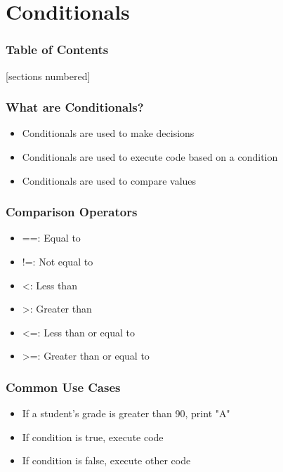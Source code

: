 \documentclass[serif, 9pt, aspectratio=32]{beamer}
\begin{document}
\section{Conditionals}

\begin{frame}
    \frametitle{Table of Contents}
    [sections numbered]
    \tableofcontents[currentsection]
\end{frame}

\begin{frame}
    \centering
    \frametitle{What are Conditionals?}
    \begin{itemize}
        \setlength{\itemsep}{3em}
        \item Conditionals are used to make decisions
        \item Conditionals are used to execute code based on a condition
        \item Conditionals are used to compare values
    \end{itemize}
\end{frame}

\begin{frame}
    \centering
    \frametitle{Comparison Operators}
    \begin{itemize}
        \setlength{\itemsep}{3em}
        \item ==: Equal to
        \item !=: Not equal to
        \item \textless: Less than
        \item \textgreater: Greater than
        \item \textless=: Less than or equal to
        \item \textgreater=: Greater than or equal to
    \end{itemize}
\end{frame}

\begin{frame}
    \centering
    \frametitle{Common Use Cases}
    \begin{itemize}
        \setlength{\itemsep}{3em}
        \item If a student's grade is greater than 90, print "A"
        \item If condition is true, execute code
        \item If condition is false, execute other code
    \end{itemize}
\end{frame}
\end{document}
